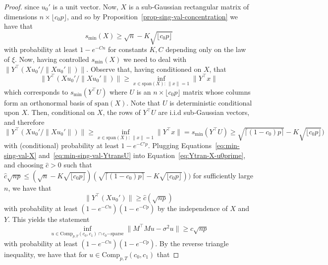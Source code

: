 \documentclass[11pt]{article}
\numberwithin{equation}{section}
\theoremstyle{remark}
\newcommand{\Comp}{\mathrm{Comp}}
\newcommand{\MinSingVal}{s_{\mathrm{min}}}
\begin{document}
\begin{proof}
    since $u_0'$ is a unit vector. Now, $X$ is a sub-Gaussian rectangular matrix of dimensions $n \times \lfloor c_0 p \rfloor$, and so by Proposition~\ref{prop-sing-val-concentration} we have that
    \begin{equation}\label{eq:min-sing-val-X}
    \MinSingVal(X) \geq \sqrt{n} - K\sqrt{\lfloor c_0 p \rfloor}
    \end{equation}
    with probability at least $1 - e^{-Cn}$ for constants $K, C$ depending only on the law of $\xi$. Now, having controlled $\MinSingVal(X)$ we need to deal with $\|Y^\top (X u_0'/\|X u_0'\|)\|$. Observe that, having conditioned on $X$, that 
    \begin{equation*}
    \|Y^\top (X u_0'/\|X u_0'\|)\| \geq \inf_{x \in \mathrm{span}(X): \, \|x\| = 1}\|Y^\top x\|
    \end{equation*}
    which corresponds to $\MinSingVal(Y^\top U)$ where $U$ is an $n \times \lfloor c_0 p \rfloor$ matrix whose columns form an orthonormal basis of $\mathrm{span}(X)$. Note that $U$ is deterministic conditional upon $X$. Then, conditional on $X$, the rows of $Y^\top U$ are i.i.d sub-Gaussian vectors, and therefore
    \begin{equation}\label{eq:min-sing-val-YtransU}
        \|Y^\top (X u_0'/\|X u_0'\|)\| \geq \inf_{x \in \mathrm{span}(X): \, \|x\| = 1}\|Y^\top x\| = \MinSingVal(Y^\top U) \geq \sqrt{\lceil (1 - c_0)p \rceil} - K \sqrt{\lfloor c_0 p \rfloor})
    \end{equation}
    with (conditional) probability at least $1 - e^{-C'p}$. Plugging Equations~\ref{eq:min-sing-val-X} and~\ref{eq:min-sing-val-YtransU} into Equation~\ref{eq:Ytran-X-u0prime}, and choosing $\hat{c} > 0$ such that $\hat{c}\sqrt{np} \leq (\sqrt{n} - K\sqrt{\lfloor c_0 p \rfloor})(\sqrt{\lceil (1 - c_0)p \rceil} - K \sqrt{\lfloor c_0 p \rfloor}))$ for sufficiently large $n$, we have that 
    \begin{equation*}
        \|Y^\top (X u_0')\| \geq \hat{c}(\sqrt{np})
    \end{equation*}
    with probability at least $(1 - e^{-Cn})(1 - e^{-Cp})$ by the independence of $X$ and $Y$. This yields the statement 
    \begin{equation}
        \inf_{u \in \Comp_{p, T}(c_0, c_1) \cap c_0\mathrm{-sparse}}\|M^\top  M u - \sigma^2 u\| \geq \hat{c}\sqrt{np}
    \end{equation}
    with probability at least $(1 - e^{-Cn})(1 - e^{-Cp})$. By the reverse triangle inequality, we have that for $u \in \Comp_{p, T}(c_0, c_1)$ that 

\end{proof}
\end{document}
